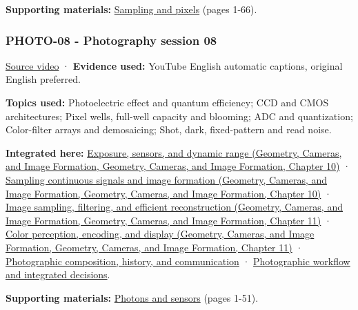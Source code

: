 \textbf{Supporting materials:} \href{https://drive.google.com/open?id=0B6w2XfPHEcZYc1lhZjNHU1NNVDQ}{Sampling and pixels} (pages 1-66).

\subsubsection{PHOTO-08 - Photography session 08}\label{04-visual-computing-ii-ch036-photo-08---photography-session-08}

\href{https://www.youtube.com/watch?v=VSdUlxgpKn4}{Source video} · \textbf{Evidence used:} YouTube English automatic captions, original English preferred.

\textbf{Topics used:} Photoelectric effect and quantum efficiency; CCD and CMOS architectures; Pixel wells, full-well capacity and blooming; ADC and quantization; Color-filter arrays and demosaicing; Shot, dark, fixed-pattern and read noise.

\textbf{Integrated here:} \href{../03-Geometry-Cameras-and-Image-Formation/main.pdf\#nameddest=03-visual-computing-i-ch003-exposure-sensors-and-dynamic-range}{Exposure, sensors, and dynamic range (Geometry, Cameras, and Image Formation, Geometry, Cameras, and Image Formation, Chapter 10)} · \href{../03-Geometry-Cameras-and-Image-Formation/main.pdf\#nameddest=03-visual-computing-i-ch003-sampling-continuous-signals-and-image-formation}{Sampling continuous signals and image formation (Geometry, Cameras, and Image Formation, Geometry, Cameras, and Image Formation, Chapter 10)} · \href{../03-Geometry-Cameras-and-Image-Formation/main.pdf\#nameddest=03-visual-computing-i-ch004-image-sampling-filtering-and-efficient-reconstruction}{Image sampling, filtering, and efficient reconstruction (Geometry, Cameras, and Image Formation, Geometry, Cameras, and Image Formation, Chapter 11)} · \href{../03-Geometry-Cameras-and-Image-Formation/main.pdf\#nameddest=03-visual-computing-i-ch004-color-perception-encoding-and-display}{Color perception, encoding, and display (Geometry, Cameras, and Image Formation, Geometry, Cameras, and Image Formation, Chapter 11)} · \hyperref[04-visual-computing-ii-ch034-photographic-composition-history-and-communication]{Photographic composition, history, and communication} · \hyperref[04-visual-computing-ii-ch034-photographic-workflow-and-integrated-decisions]{Photographic workflow and integrated decisions}.

\textbf{Supporting materials:} \href{https://drive.google.com/open?id=0B6w2XfPHEcZYell0Tkt2YjkwYWc}{Photons and sensors} (pages 1-51).

